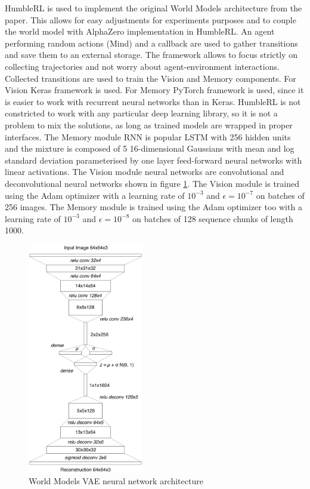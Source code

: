 HumbleRL is used to implement the original World Models architecture from the paper. This allows for easy adjustments for experiments purposes and to couple the world model with AlphaZero implementation in HumbleRL. An agent performing random actions (Mind) and a callback are used to gather transitions and save them to an external storage. The framework allows to focus strictly on collecting trajectories and not worry about agent-environment interactions.
Collected transitions are used to train the Vision and Memory components. For Vision Keras \cite{Code.Keras} framework is used. For Memory PyTorch \cite{Code.PyTorch} framework is used, since it is easier to work with recurrent neural networks than in Keras. HumbleRL is not constricted to work with any particular deep learning library, so it is not a problem to mix the solutions, as long as trained models are wrapped in proper interfaces.
The Memory module RNN is popular LSTM \cite{Algo.LSTM} with 256 hidden units and the mixture is composed of 5 16-dimensional Gaussians with mean and log standard deviation parameterised by one layer feed-forward neural networks with linear activations. The Vision module neural networks are convolutional and deconvolutional neural networks shown in figure \ref{Fig.WorldModelsVAEArchitecture}.
The Vision module is trained using the Adam optimizer \cite{Algo.Adam} with a learning rate of $10^{-3}$ and $\epsilon = 10^{−7}$ on batches of 256 images. The Memory module is trained using the Adam optimizer \cite{Algo.Adam} too with a learning rate of $10^{-3}$ and $\epsilon = 10^{−8}$ on batches of 128 sequence chunks of length 1000.

\begin{figure}[H]
\includegraphics[width=0.45\textwidth,keepaspectratio]{figures/WorldModels/world_models_vae_architecture.png}
\caption{World Models VAE neural network architecture \cite{Algo.WorldModels}}
\label{Fig.WorldModelsVAEArchitecture}
\end{figure}


